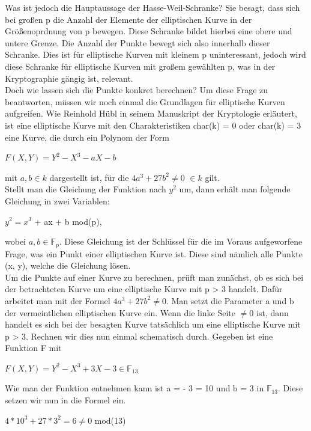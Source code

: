 Was ist jedoch die Hauptaussage der Hasse-Weil-Schranke? Sie besagt, dass sich bei großen p die Anzahl der Elemente der elliptischen Kurve in der Größenoprdnung von p bewegen. Diese Schranke bildet hierbei eine obere und untere Grenze. Die Anzahl der Punkte bewegt sich also innerhalb dieser Schranke. Dies ist für elliptische Kurven mit kleinem p uninteressant, jedoch wird diese Schranke für elliptische Kurven mit großem gewählten p, was in der Kryptographie gängig ist, relevant.\\


Doch wie lassen sich die Punkte konkret berechnen? Um diese Frage zu beantworten, müssen wir noch einmal die Grundlagen für elliptische Kurven aufgreifen. Wie Reinhold Hübl in seinem Manuskript der Kryptologie \cite[vgl.][S. 157]{reinholdhuebl} erläutert, ist eine elliptische Kurve mit den Charakteristiken char(k) = 0 oder char(k) = 3 eine Kurve, die durch ein Polynom der Form
\begin{center}
$F(X, Y) = Y^{2} - X^{3} - aX - b$
\end{center} 

mit $a, b \in k$ dargestellt ist, für die $4a^3 + 27b^2 \neq 0$  $\in k$ gilt.\\

Stellt man die Gleichung der Funktion nach $y^{2}$ um, dann erhält man folgende Gleichung in zwei Variablen:
\begin{center}
$y^{2} =  x^{3}$ + ax + b  mod(p),
\end{center}

wobei $a, b \in \mathbb{F}_p$. Diese Gleichung ist der Schlüssel für die im Voraus aufgeworfene Frage, was ein Punkt einer elliptischen Kurve ist. Diese sind nämlich alle Punkte (x, y), welche die Gleichung lösen.\\

Um die Punkte auf einer Kurve zu berechnen, prüft man zunächst, ob es sich bei der betrachteten Kurve um eine elliptische Kurve mit p > 3 handelt. Dafür arbeitet man mit der Formel  $4a^3 + 27b^2 \neq 0$. Man setzt die Parameter a und b der vermeintlichen elliptischen Kurve ein. Wenn die linke Seite $\neq 0$ ist, dann handelt es sich bei der besagten Kurve tatsächlich um eine elliptische Kurve mit p > 3. Rechnen wir dies nun einmal schematisch durch. Gegeben ist eine Funktion F mit
\begin{center}
$F(X, Y) = Y^{2} - X^{3} + 3X - 3 \in \mathbb{F}_{13}$
\end{center} 

Wie man der Funktion entnehmen kann ist a = - 3 = 10 und b = 3 in $\mathbb{F}_{13}$. Diese setzen wir nun in die Formel ein.
\begin{center}
$4 * 10^3 + 27 * 3^2 = 6 \neq 0$ mod(13)
\end{center} 


